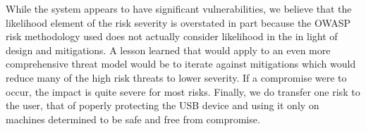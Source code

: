While the system appears to have significant vulnerabilities, we believe that the likelihood element of the risk severity is overstated in part because the OWASP risk methodology used does not actually consider likelihood in the in light of design and mitigations. A lesson learned that would apply to an even more comprehensive threat model would be to iterate against mitigations which would reduce many of the high risk threats to lower severity. If a compromise were to occur, the impact is quite severe for most risks.  Finally, we do transfer  one risk to the user, that of poperly protecting the USB device and using it only on machines determined to be safe and free from compromise.

